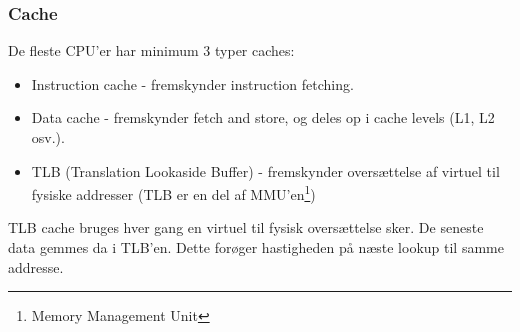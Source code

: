 \subsubsection{Cache}
De fleste CPU'er har minimum 3 typer caches:
\begin{itemize}
	\item Instruction cache - fremskynder instruction fetching.
	\item Data cache - fremskynder fetch and store, og deles op i cache levels (L1, L2 osv.).
	\item TLB (Translation Lookaside Buffer) - fremskynder oversættelse af virtuel til fysiske addresser (TLB er en del af MMU'en\footnote{Memory Management Unit})
\end{itemize}
TLB cache bruges hver gang en virtuel til fysisk oversættelse sker. De seneste data gemmes da i TLB’en. Dette forøger hastigheden på næste lookup til samme addresse.